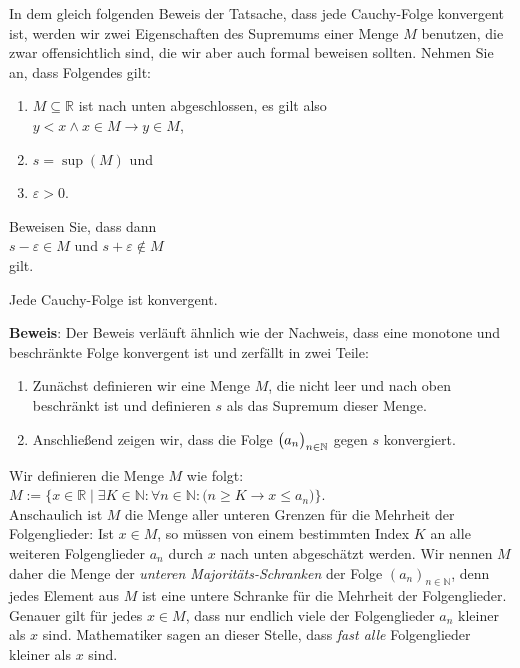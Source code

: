 \exercise
In dem gleich folgenden Beweis der Tatsache, dass jede Cauchy-Folge konvergent ist, werden wir zwei
Eigenschaften des Supremums einer Menge $M$ benutzen, die zwar offensichtlich sind, die wir aber auch
formal beweisen sollten.  Nehmen Sie an, dass Folgendes gilt:
\begin{enumerate}
\item $M \subseteq \mathbb{R}$ ist nach unten abgeschlossen, es gilt also
      \\[0.2cm]
      \hspace*{1.3cm}
      $y < x \wedge x \in M \rightarrow y \in M$,
\item $s = \sup(M)$ \quad und
\item $\varepsilon > 0$.
\end{enumerate}
Beweisen Sie, dass dann
\\[0.2cm]
\hspace*{1.3cm}
$s - \varepsilon \in M$ \quad und \quad $s + \varepsilon \not\in M$
\\[0.2cm] 
gilt. \eox

\begin{Theorem}
Jede Cauchy-Folge ist konvergent.  
\end{Theorem}
\textbf{Beweis}: Der Beweis verl\"auft \"ahnlich wie der Nachweis, dass eine monotone und
beschr\"ankte Folge konvergent ist und zerf\"allt in zwei Teile: 
\begin{enumerate}
\item Zun\"achst definieren wir eine Menge $M$, die nicht leer und nach oben beschr\"ankt ist
      und definieren $s$ als das Supremum dieser Menge.
\item Anschlie\ss{}end zeigen wir, dass die Folge $\bigl(a_n\bigr)_{n\in\mathbb{N}}$ gegen $s$ konvergiert.
\end{enumerate}
Wir definieren die Menge $M$ wie folgt:
\\[0.2cm]
\hspace*{1.3cm}
$M := \bigl\{ x \in \mathbb{R} \mid \exists K \in \mathbb{N}: \forall n \in \mathbb{N}:\bigl( n \geq K \rightarrow x \leq a_n\bigr) \bigr\}$.
\\[0.2cm]
Anschaulich ist $M$ die Menge aller unteren Grenzen f\"ur die Mehrheit der
Folgenglieder:  Ist $x \in M$, so m\"ussen von einem bestimmten Index $K$ an
alle weiteren Folgenglieder $a_n$ durch $x$ nach unten abgesch\"atzt werden.
Wir nennen $M$ daher die Menge der \emph{unteren Majorit\"ats-Schranken} der Folge
$(a_n)_{n\in\mathbb{N}}$, denn jedes Element aus $M$ ist eine untere Schranke f\"ur die Mehrheit der
Folgenglieder.  Genauer gilt f\"ur jedes $x \in M$, dass nur endlich viele der Folgenglieder $a_n$
kleiner als $x$ sind.  Mathematiker sagen an dieser Stelle, dass \emph{fast alle} Folgenglieder
kleiner als $x$ sind.

